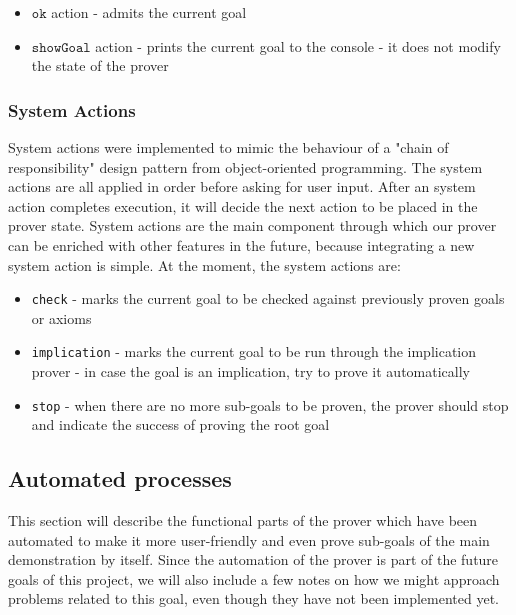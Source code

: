 \documentclass[12pt,a4paper]{article}
\begin{document}
{\begin{itemize}
\begin{itemize}
			\item If the result corresponds to what the prover was expecting, we modify the state by adding the newly generated goals to the \textbf{GoalStack}, by moving down the "meta"-hierarchy - parsing meta-representation of terms.
			\item The last thing to note is an example of how the rules generate output independent of other applications. In the last field of the \textbf{Prover State}, as \textbf{StagingOutput}, there will be a list of quoted identifiers which will eventually get moved to the loop state and then outputted to the user.
		\end{itemize}
		All the other actions which control the application of proof rules are written in a similar manner.
	\item {\(\mathtt{ok}\) action - admits the current goal}
	\item {\(\mathtt{showGoal}\) action - prints the current goal to the console - it does not modify the state of the prover}
\end{itemize}
\subsubsection{System Actions}
System actions were implemented to mimic the behaviour of a "chain of responsibility" design pattern from object-oriented programming. The system actions are all applied in order before asking for user input. After an system action completes execution, it will decide the next action to be placed in the prover state. System actions are the main component through which our prover can be enriched with other features in the future, because integrating a new system action is simple. At the moment, the system actions are:
\begin{itemize}
	\item {\texttt{check}} - marks the current goal to be checked against previously proven goals or axioms
	\item {\texttt{implication}} - marks the current goal to be run through the implication prover - in case the goal is an implication, try to prove it automatically
	\item {\texttt{stop}} - when there are no more sub-goals to be proven, the prover should stop and indicate the success of proving the root goal
\end{itemize}
\subsection{Automated processes}
This section will describe the functional parts of the prover which have been automated to make it more user-friendly and even prove sub-goals of the main demonstration by itself. Since the automation of the prover is part of the future goals of this project, we will also include a few notes on how we might approach problems related to this goal, even though they have not been implemented yet.
}
\end{document}
